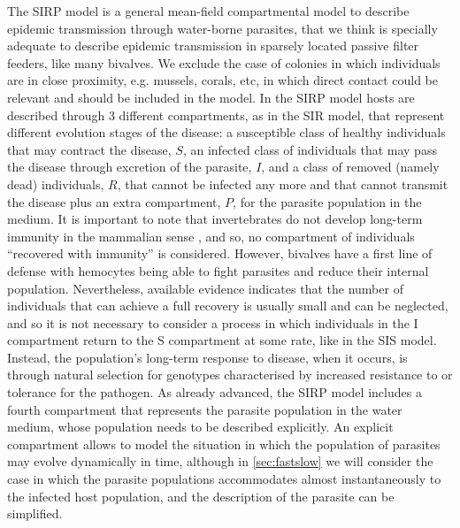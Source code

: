 The SIRP model is a general mean-field compartmental model to describe
epidemic transmission through water-borne parasites, that we think is specially
adequate to describe epidemic transmission in sparsely located passive filter
feeders, like many bivalves.  We exclude the case of colonies in which
individuals are in close proximity, e.g. mussels, corals, etc, in which direct
contact could be relevant and should be included in the model. In the SIRP
model hosts are described through $3$ different compartments, as in the SIR
model, that represent different evolution stages of the disease: a susceptible
class of healthy individuals that may contract the disease, $S$, an infected
class of individuals that may pass the disease through excretion of the
parasite, $I$, and a class of removed (namely dead) individuals, $R$, that
cannot be infected any more and that cannot transmit the disease plus an extra
compartment, $P$, for the parasite population in the medium. It is important to
note that invertebrates do not develop long-term immunity in the mammalian
sense \cite{Powell2015}, and so, no compartment of individuals ``recovered
with immunity'' is considered. However, bivalves have a first line of defense
with hemocytes being able to fight  parasites and reduce their internal
population. Nevertheless, available evidence indicates that the number of
individuals that can achieve a full recovery is usually small and can be
neglected, and so it is not necessary to consider a process in which
individuals in the I compartment return to the S compartment at some rate, like
in the SIS model. Instead, the population’s long-term response to disease, when
it occurs, is through natural selection for genotypes characterised by
increased resistance to or tolerance for the pathogen. As already advanced, the
SIRP model includes a
fourth compartment that represents the parasite population in the water
medium, whose population needs to be described explicitly. An explicit
compartment allows to model the situation in which the population of parasites
may evolve dynamically in time, although in \cref{sec:fastslow} we will
consider the case in which the parasite populations accommodates almost
instantaneously to the infected host population, and the description of the
parasite can be simplified.

